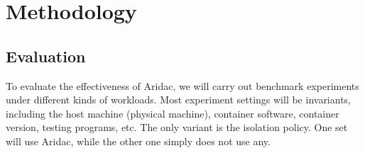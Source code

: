 \documentclass[10pt, conference,compsoc]{IEEEtran}
\begin{document}
%






\section{Methodology}
\subsection{Evaluation}
To evaluate the effectiveness of Aridac, we will carry out benchmark experiments under different kinds of workloads. Most experiment settings will be invariants, including the host machine (physical machine), container software, container version, testing programs, etc. The only variant is the isolation policy. One set will use Aridac, while the other one simply does not use any.
\end{document}
